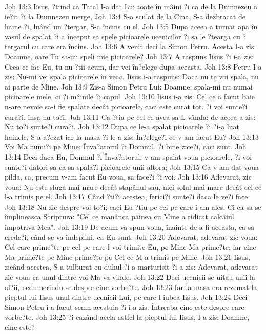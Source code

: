 Joh 13:3  Iisus, ?tiind ca Tatal I-a dat Lui toate în mâini ?i ca de la Dumnezeu a ie?it ?i la Dumnezeu merge,
Joh 13:4  S-a sculat de la Cina, S-a dezbracat de haine ?i, luând un ?tergar, S-a încins cu el.
Joh 13:5  Dupa aceea a turnat apa în vasul de spalat ?i a început sa spele picioarele ucenicilor ?i sa le ?tearga cu ?tergarul cu care era încins.
Joh 13:6  A venit deci la Simon Petru. Acesta I-a zis: Doamne, oare Tu sa-mi speli mie picioarele?
Joh 13:7  A raspuns Iisus ?i i-a zis: Ceea ce fac Eu, tu nu ?tii acum, dar vei în?elege dupa aceasta.
Joh 13:8  Petru I-a zis: Nu-mi vei spala picioarele în veac. Iisus i-a raspuns: Daca nu te voi spala, nu ai parte de Mine.
Joh 13:9  Zis-a Simon Petru Lui: Doamne, spala-mi nu numai picioarele mele, ci ?i mâinile ?i capul.
Joh 13:10  Iisus i-a zis: Cel ce a facut baie n-are nevoie sa-i fie spalate decât picioarele, caci este curat tot. ?i voi sunte?i cura?i, însa nu to?i.
Joh 13:11  Ca ?tia pe cel ce avea sa-L vânda; de aceea a zis: Nu to?i sunte?i cura?i.
Joh 13:12  Dupa ce le-a spalat picioarele ?i ?i-a luat hainele, S-a a?ezat iar la masa ?i le-a zis: În?elege?i ce v-am facut Eu?
Joh 13:13  Voi Ma numi?i pe Mine: Înva?atorul ?i Domnul, ?i bine zice?i, caci sunt.
Joh 13:14  Deci daca Eu, Domnul ?i Înva?atorul, v-am spalat voua picioarele, ?i voi sunte?i datori sa ca sa spala?i picioarele unii altora;
Joh 13:15  Ca v-am dat voua pilda, ca, precum v-am facut Eu voua, sa face?i ?i voi.
Joh 13:16  Adevarat, zic voua: Nu este sluga mai mare decât stapânul sau, nici solul mai mare decât cel ce l-a trimis pe el.
Joh 13:17  Când ?ti?i acestea, ferici?i sunte?i daca le ve?i face.
Joh 13:18  Nu zic despre voi to?i; caci Eu ?tiu pe cei pe care i-am ales. Ci ca sa se împlineasca Scriptura: "Cel ce manânca pâinea cu Mine a ridicat calcâiul împotriva Mea".
Joh 13:19  De acum va spun voua, înainte de a fi aceasta, ca sa crede?i, când se va îndeplini, ca Eu sunt.
Joh 13:20  Adevarat, adevarat zic voua: Cel care prime?te pe cel pe care-l voi trimite Eu, pe Mine Ma prime?te; iar cine Ma prime?te pe Mine prime?te pe Cel ce M-a trimis pe Mine.
Joh 13:21  Iisus, zicând acestea, S-a tulburat cu duhul ?i a marturisit ?i a zis: Adevarat, adevarat zic voua ca unul dintre voi Ma va vinde.
Joh 13:22  Deci ucenicii se uitau unii la al?ii, nedumerindu-se despre cine vorbe?te.
Joh 13:23  Iar la masa era rezemat la pieptul lui Iisus unul dintre ucenicii Lui, pe care-l iubea Iisus.
Joh 13:24  Deci Simon Petru i-a facut semn acestuia ?i i-a zis: Întreaba cine este despre care vorbe?te.
Joh 13:25  ?i cazând acela astfel la pieptul lui Iisus, I-a zis: Doamne, cine este?
